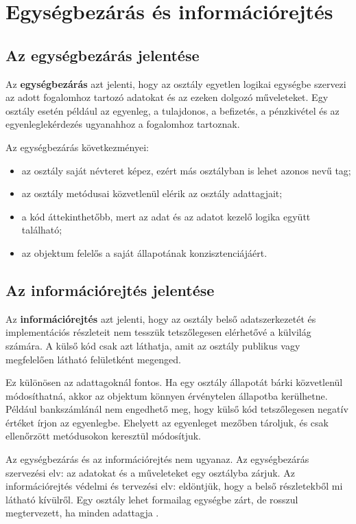 \section{Egységbezárás és információrejtés}

\subsection{Az egységbezárás jelentése}

Az \textbf{egységbezárás} azt jelenti, hogy az osztály egyetlen logikai egységbe szervezi az adott fogalomhoz tartozó adatokat és az ezeken dolgozó műveleteket. Egy  osztály esetén például az egyenleg, a tulajdonos, a befizetés, a pénzkivétel és az egyenleglekérdezés ugyanahhoz a fogalomhoz tartoznak.

Az egységbezárás következményei:

\begin{itemize}
  \item az osztály saját névteret képez, ezért más osztályban is lehet azonos nevű tag;
  \item az osztály metódusai közvetlenül elérik az osztály adattagjait;
  \item a kód áttekinthetőbb, mert az adat és az adatot kezelő logika együtt található;
  \item az objektum felelős a saját állapotának konzisztenciájáért.
\end{itemize}

\subsection{Az információrejtés jelentése}

Az \textbf{információrejtés} azt jelenti, hogy az osztály belső adatszerkezetét és implementációs részleteit nem tesszük tetszőlegesen elérhetővé a külvilág számára. A külső kód csak azt láthatja, amit az osztály publikus vagy megfelelően látható felületként megenged.

Ez különösen az adattagoknál fontos. Ha egy osztály állapotát bárki közvetlenül módosíthatná, akkor az objektum könnyen érvénytelen állapotba kerülhetne. Például bankszámlánál nem engedhető meg, hogy külső kód tetszőlegesen negatív értéket írjon az egyenlegbe. Ehelyett az egyenleget  mezőben tároljuk, és csak ellenőrzött metódusokon keresztül módosítjuk.

\begin{warningbox}
Az egységbezárás és az információrejtés nem ugyanaz. Az egységbezárás szervezési elv: az adatokat és a műveleteket egy osztályba zárjuk. Az információrejtés védelmi és tervezési elv: eldöntjük, hogy a belső részletekből mi látható kívülről. Egy osztály lehet formailag egységbe zárt, de rosszul megtervezett, ha minden adattagja .
\end{warningbox}

